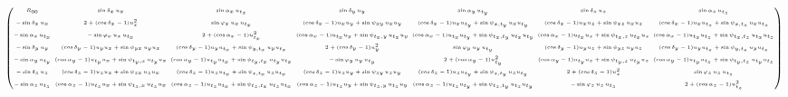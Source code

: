 \documentclass{article}
\begin{document}
\begin{landscape}
\begin{equation}
\tiny
\setlength{\arraycolsep}{2pt}
\begin{pmatrix} 
R_{00} & \sin\delta_x\, u_x & \sin\alpha_x\, u_{t_x} & \sin\delta_y\, u_y & \sin\alpha_y\, u_{t_y} & \sin\delta_z\, u_z & \sin\alpha_z\, u_{t_z} \\[2mm]
-\sin\delta_x\, u_x & 2+(\cos\delta_x-1)u_x^2 & \sin\varphi_x\, u_x\, u_{t_x} & (\cos\delta_x-1)u_xu_y + \sin\psi_{xy}\, u_xu_y & (\cos\delta_x-1)u_xu_{t_y} + \sin\psi_{x,t_y}\, u_xu_{t_y} & (\cos\delta_x-1)u_xu_z + \sin\psi_{xz}\, u_xu_z & (\cos\delta_x-1)u_xu_{t_z} + \sin\psi_{x,t_z}\, u_xu_{t_z} \\[2mm]
-\sin\alpha_x\, u_{t_x} & -\sin\varphi_x\, u_x\, u_{t_x} & 2+(\cos\alpha_x-1)u_{t_x}^2 & (\cos\alpha_x-1)u_{t_x}u_y + \sin\psi_{t_x,y}\, u_{t_x}u_y & (\cos\alpha_x-1)u_{t_x}u_{t_y} + \sin\psi_{t_x,t_y}\, u_{t_x}u_{t_y} & (\cos\alpha_x-1)u_{t_x}u_z + \sin\psi_{t_x,z}\, u_{t_x}u_z & (\cos\alpha_x-1)u_{t_x}u_{t_z} + \sin\psi_{t_x,t_z}\, u_{t_x}u_{t_z} \\[2mm]
-\sin\delta_y\, u_y & (\cos\delta_y-1)u_yu_x + \sin\psi_{yx}\, u_yu_x & (\cos\delta_y-1)u_yu_{t_x} + \sin\psi_{y,t_x}\, u_yu_{t_x} & 2+(\cos\delta_y-1)u_y^2 & \sin\varphi_y\, u_y\, u_{t_y} & (\cos\delta_y-1)u_yu_z + \sin\psi_{yz}\, u_yu_z & (\cos\delta_y-1)u_yu_{t_z} + \sin\psi_{y,t_z}\, u_yu_{t_z} \\[2mm]
-\sin\alpha_y\, u_{t_y} & (\cos\alpha_y-1)u_{t_y}u_x + \sin\psi_{t_y,x}\, u_{t_y}u_x & (\cos\alpha_y-1)u_{t_y}u_{t_x} + \sin\psi_{t_y,t_x}\, u_{t_y}u_{t_x} & -\sin\varphi_y\, u_y\, u_{t_y} & 2+(\cos\alpha_y-1)u_{t_y}^2 & (\cos\alpha_y-1)u_{t_y}u_z + \sin\psi_{t_y,z}\, u_{t_y}u_z & (\cos\alpha_y-1)u_{t_y}u_{t_z} + \sin\psi_{t_y,t_z}\, u_{t_y}u_{t_z} \\[2mm]
-\sin\delta_z\, u_z & (\cos\delta_z-1)u_zu_x + \sin\psi_{zx}\, u_zu_x & (\cos\delta_z-1)u_zu_{t_x} + \sin\psi_{z,t_x}\, u_zu_{t_x} & (\cos\delta_z-1)u_zu_y + \sin\psi_{zy}\, u_zu_y & (\cos\delta_z-1)u_zu_{t_y} + \sin\psi_{z,t_y}\, u_zu_{t_y} & 2+(\cos\delta_z-1)u_z^2 & \sin\varphi_z\, u_z\, u_{t_z} \\[2mm]
-\sin\alpha_z\, u_{t_z} & (\cos\alpha_z-1)u_{t_z}u_x + \sin\psi_{t_z,x}\, u_{t_z}u_x & (\cos\alpha_z-1)u_{t_z}u_{t_x} + \sin\psi_{t_z,t_x}\, u_{t_z}u_{t_x} & (\cos\alpha_z-1)u_{t_z}u_y + \sin\psi_{t_z,y}\, u_{t_z}u_y & (\cos\alpha_z-1)u_{t_z}u_{t_y} + \sin\psi_{t_z,t_y}\, u_{t_z}u_{t_y} & -\sin\varphi_z\, u_z\, u_{t_z} & 2+(\cos\alpha_z-1)u_{t_z}^2
\end{pmatrix}
\end{equation}



\end{landscape}
\end{document}
